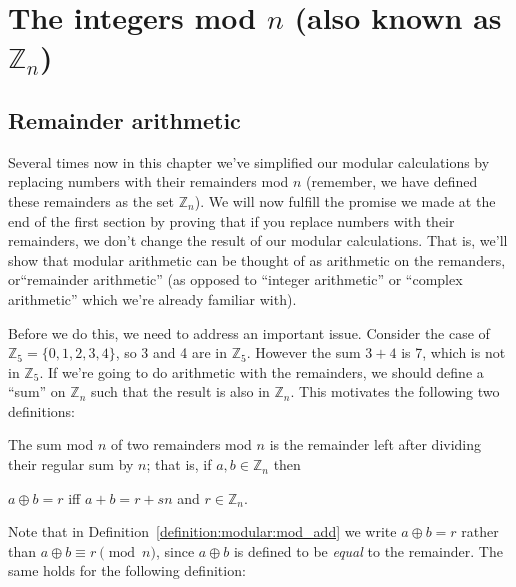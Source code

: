 \section{The integers mod $n$ (also known as ${\mathbb Z}_n$)\quad
{}}\label{sec:intMod_n}

\subsection{Remainder arithmetic}\label{ArithWithRems}
Several times now in this chapter we've simplified our modular calculations by replacing numbers with their remainders mod $n$ (remember, we have defined these remainders as the set ${\mathbb Z}_n$).  We will now fulfill the promise we made at the end of the first section by proving that if you replace numbers with their remainders, we don't change the result of our modular calculations.  That is, we'll show that modular arithmetic can be thought of as arithmetic on the remanders, or``remainder arithmetic'' (as opposed to ``integer arithmetic'' or ``complex arithmetic'' which we're already familiar with).

Before we do this, we need to address an important issue. Consider the case of $\mathbb{Z}_5 = \{0,1,2,3,4\}$, so 3 and 4 are in $\mathbb{Z}_5$. However the sum $3 + 4$ is 7, which is not in $\mathbb{Z}_5$. If we're going to do arithmetic with the remainders, we should define a ``sum'' on $\mathbb{Z}_n$ such that the result is also in $\mathbb{Z}_n$. This motivates the following two definitions:




\begin{defn}\label{definition:modular:mod_add}

\noindent
The sum mod $n$ of two remainders mod $n$ is the remainder left after dividing their regular sum by $n$; that is, if $a,b \in {\mathbb Z}_n$ then

\begin{center}
$a \oplus b = r$ iff  $a + b = r + sn$ and 
$r \in {\mathbb Z}_n.$
\end{center}
\end{defn}
Note that in Definition~\ref{definition:modular:mod_add} we write $a \oplus b = r$ rather than $a \oplus b \equiv r \pmod{n}$, since $a \oplus b$ is defined to be \emph{equal} to the remainder. The same holds for the following definition:

